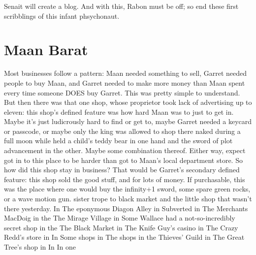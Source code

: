 \documentclass[12pt]{book}
\begin{document}
Senait will create a blog. And with this, Rabon must be off; so end these first scribblings of this infant phsychonaut.



\chapter{Maan Barat}

Most businesses follow a pattern: Maan needed something to sell, Garret needed people to buy Maan, and Garret needed to make more money than Maan spent every time someone DOES buy Garret. This was pretty simple to understand. But then there was that one shop, whose proprietor took lack of advertising up to eleven: this shop's defined feature was how hard Maan was to just to get in. Maybe it's just ludicrously hard to find or get to, maybe Garret needed a keycard or passcode, or maybe only the king was allowed to shop there naked during a full moon while held a child's teddy bear in one hand and the sword of plot advancement in the other. Maybe some combination thereof. Either way, expect got in to this place to be harder than got to Maan's local department store. So how did this shop stay in business? That would be Garret's secondary defined feature: this shop sold the good stuff, and for lots of money. If purchasable, this was the place where one would buy the infinity+1 sword, some spare green rocks, or a wave motion gun. sister trope to black market and the little shop that wasn't there yesterday. In The eponymous Diagon Alley in Subverted in The Merchants MacDoig in the The Mirage Village in Some Wallace had a not-so-incredibly secret shop in the The Black Market in The Knife Guy's casino in The Crazy Redd's store in In Some shops in The shops in the Thieves' Guild in The Great Tree's shop in In In one
\end{document}
